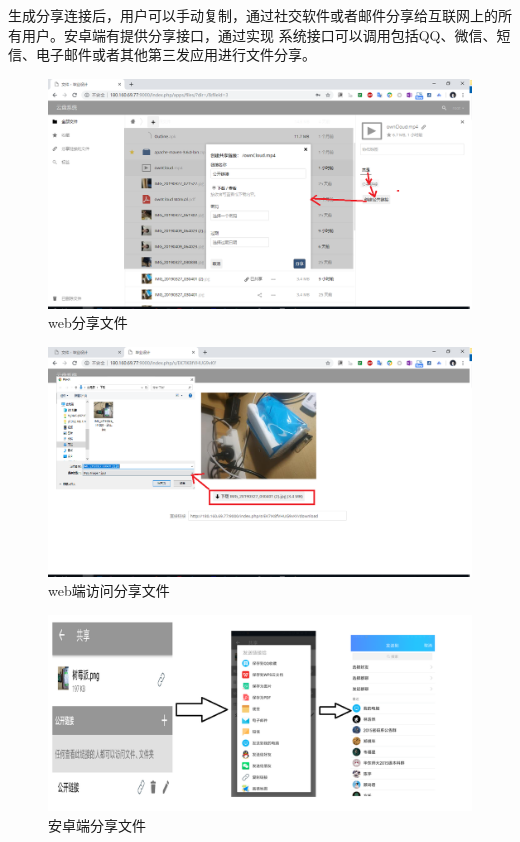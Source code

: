 生成分享连接后，用户可以手动复制，通过社交软件或者邮件分享给互联网上的所有用户。安卓端有提供分享接口，通过实现
系统接口可以调用包括QQ、微信、短信、电子邮件或者其他第三发应用进行文件分享。
\begin{figure}[H]
    \centering
    \includegraphics[width=130mm]{./figures/web_file_share_1.png}
    \caption{web分享文件}
    \label{android_videos}
  \end{figure}
\begin{figure}[H]
\centering
\includegraphics[width=130mm]{./figures/web_file_share_2.png}
\caption{web端访问分享文件}
\label{android_videos}
\end{figure}

\begin{figure}[H]
    \centering
    \includegraphics[width=130mm]{./figures/android_file_share.png}
    \caption{安卓端分享文件}
    \label{android_videos}
  \end{figure}

